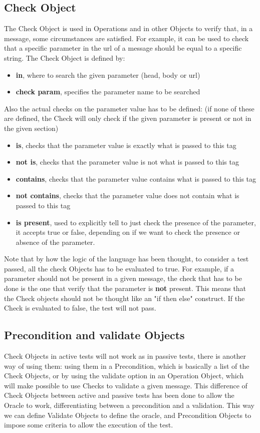\subsection{Check Object}
The Check Object is used in Operations and in other Objects to verify that, in a message, some circumstances are satisfied. For example, it can be used to check that a specific parameter in the url of a message should be equal to a specific string.
The Check Object is defined by:
\begin{itemize}
    \item \textbf{in}, where to search the given parameter (head, body or url)
    \item \textbf{check param}, specifies the parameter name to be searched
\end{itemize}
Also the actual checks on the parameter value has to be defined: (if none of these are defined, the Check will only check if the given parameter is present or not in the given section)
\begin{itemize}
    \item \textbf{is}, checks that the parameter value is exactly what is passed to this tag
    \item \textbf{not is}, checks that the parameter value is not what is passed to this tag
    \item \textbf{contains}, checks that the parameter value contains what is passed to this tag 
    \item \textbf{not contains}, checks that the parameter value does not contain what is passed to this tag 
    \item \textbf{is present}, used to explicitly tell to just check the presence of the parameter, it accepts true or false, depending on if we want to check the presence or absence of the parameter.
\end{itemize}

Note that by how the logic of the language has been thought, to consider a test passed, all the check Objects has to be evaluated to true. For example, if a parameter should not be present in a given message, the check that has to be done is the one that verify that the parameter is \textbf{not} present. This means that the Check objects should not be thought like an "if then else" construct. If the Check is evaluated to false, the test will not pass.

\subsection{Precondition and validate Objects}
Check Objects in active tests will not work as in passive tests, there is another way of using them: using them in a Precondition, which is basically a list of the Check Objects, or by using the validate option in an Operation Object, which will make possible to use Checks to validate a given message. This difference of Check Objects between active and passive tests has been done to allow the Oracle to work, differentiating between a precondition and a validation. This way we can define Validate Objects to define the oracle, and Precondition Objects to impose some criteria to allow the execution of the test.
